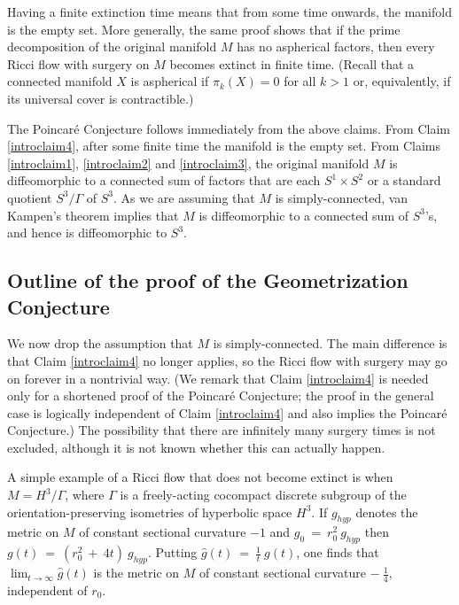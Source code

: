 Having a finite extinction time means that from some time onwards, the
manifold is the empty set.
More generally, the same proof shows that
if the prime decomposition of the original manifold $M$
has no aspherical factors, then every Ricci flow with surgery on $M$
becomes extinct in finite time.
(Recall that a connected manifold $X$ is aspherical if
$\pi_k(X) = 0$ for all $k > 1$ or, equivalently, if its
universal cover is contractible.)

The Poincar\'e Conjecture follows immediately from the above claims.
From Claim \ref{introclaim4},
after some finite time the manifold is the empty set.
From Claims \ref{introclaim1}, \ref{introclaim2} and \ref{introclaim3},
the original manifold $M$ is diffeomorphic to a connected sum of
factors that are each $S^1 \times S^2$ or a standard quotient
$S^3/\Gamma$ of $S^3$. As we are assuming that $M$ is simply-connected,
van Kampen's theorem implies that $M$ is diffeomorphic to a connected
sum of $S^3$'s, and hence is diffeomorphic to $S^3$.





\subsection{Outline of the proof of the Geometrization Conjecture}
We now drop the assumption that $M$ is
simply-connected. The main difference is that
Claim \ref{introclaim4} no longer applies, so the Ricci flow with surgery may
go on forever in a nontrivial way.  (We remark that Claim \ref{introclaim4}
is needed only for a shortened proof of the Poincar\'e Conjecture; the proof
in the general case is logically independent of Claim \ref{introclaim4} and
also implies the Poincar\'e Conjecture.)
The possibility that there are infinitely many surgery times is
not excluded, although it is not
known whether this can actually happen.

A simple example of a Ricci flow that does not become extinct is when
$M = H^3/\Gamma$, where $\Gamma$ is a freely-acting cocompact discrete subgroup
of the orientation-preserving isometries of hyperbolic space $H^3$. If
$g_{hyp}$ denotes the metric on $M$ of constant sectional curvature
$-1$ and $g_0 \: = \: r_0^2 \: g_{hyp}$ then
$g(t) \: = \: (r_0^2 \: + \: 4t) \: g_{hyp}$. Putting
$\widehat{g}(t) \: = \: \frac{1}{t} \: g(t)$, one finds that
$\lim_{t \rightarrow \infty} \widehat{g}(t)$ is the metric on $M$
of constant sectional curvature $- \: \frac14$, independent of
$r_0$.

